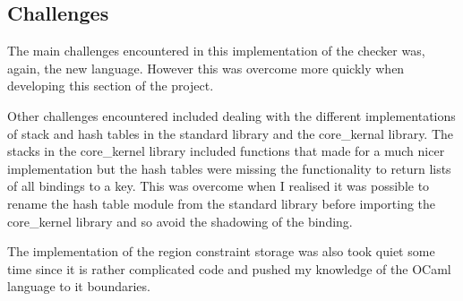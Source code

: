 \subsection{Challenges}
The main challenges encountered in this implementation of the checker was, again, the new language. However this was overcome more quickly when developing this section of the project.

Other challenges encountered included dealing with the different implementations of stack and hash tables in the standard library and the core_kernal library. The stacks in the core_kernel library included functions that made for a much nicer implementation but the hash tables were missing the functionality to return lists of all bindings to a key. This was overcome when I realised it was possible to rename the hash table module from the standard library before importing the core_kernel library and so avoid the shadowing of the binding. 

The implementation of the region constraint storage was also took quiet some time since it is rather complicated code and pushed my knowledge of the OCaml language to it boundaries. 


